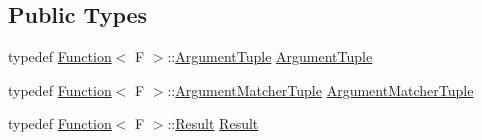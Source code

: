 \subsection*{Public Types}
\begin{DoxyCompactItemize}
\item 
typedef \hyperlink{structtesting_1_1internal_1_1Function}{Function}$<$ F $>$\+::\hyperlink{classtesting_1_1internal_1_1TypedExpectation_a9a91379262d101f435809ba4556d14fa}{Argument\+Tuple} \hyperlink{classtesting_1_1internal_1_1TypedExpectation_a9a91379262d101f435809ba4556d14fa}{Argument\+Tuple}
\item 
typedef \hyperlink{structtesting_1_1internal_1_1Function}{Function}$<$ F $>$\+::\hyperlink{classtesting_1_1internal_1_1TypedExpectation_a8f10e3906761cc5c10fa3561c6e8938e}{Argument\+Matcher\+Tuple} \hyperlink{classtesting_1_1internal_1_1TypedExpectation_a8f10e3906761cc5c10fa3561c6e8938e}{Argument\+Matcher\+Tuple}
\item 
typedef \hyperlink{structtesting_1_1internal_1_1Function}{Function}$<$ F $>$\+::\hyperlink{classtesting_1_1internal_1_1TypedExpectation_a6503597ee9d5ec940bfe8e51832b2422}{Result} \hyperlink{classtesting_1_1internal_1_1TypedExpectation_a6503597ee9d5ec940bfe8e51832b2422}{Result}
\end{DoxyCompactItemize}
